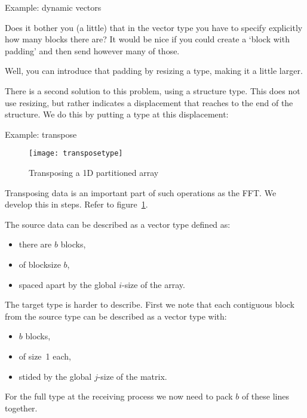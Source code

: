  {Example: dynamic vectors}

Does it bother you (a little) that in the vector type you
have to specify explicitly how many blocks there are?
It would be nice if you could create a `block with padding'
and then send however many of those.

Well, you can introduce that padding by resizing a type,
making it a little larger.


There is a second solution to this problem, using a structure type.
This does not use resizing, but rather indicates a displacement
that reaches to the end of the structure. We do this
by putting a type  at this displacement:


 {Example: transpose}

\begin{figure}[ht]
  \texttt{[image: transposetype]}
  \caption{Transposing a 1D partitioned array}
  \label{fig:transposetype} 
\end{figure}
Transposing data is an important part of such operations as the \ac{FFT}.
We develop this in steps. Refer to figure~\ref{fig:transposetype}.

The source data can be described as a vector type defined as:
\begin{itemize}
\item there are $b$ blocks,
\item of blocksize $b$,
\item spaced apart by the global $i$-size of the array.
\end{itemize}

The target type is harder to describe.
First we note that each contiguous block from the source type
can be described as a vector type with:
\begin{itemize}
\item $b$ blocks,
\item of size~1 each,
\item stided by the global $j$-size of the matrix.
\end{itemize}
%

For the full type at the receiving process we now need to pack
$b$ of these lines together.

